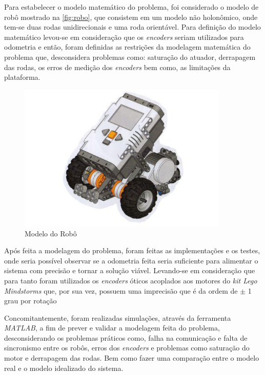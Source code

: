 Para estabelecer o modelo matemático do problema, foi considerado o modelo de robô mostrado na \autoref{fig:robo}, que consistem em um modelo não holonômico, onde tem-se duas rodas unidirecionais e uma roda orientável. Para definição do modelo matemático levou-se em consideração que os \emph{encoders} seriam utilizados para odometria e então, foram definidas as restrições da modelagem matemática do problema que, desconsidera problemas como: saturação do atuador, derrapagem das rodas, os erros de medição dos \emph{encoders} bem como, as limitações da plataforma. %

\begin{figure}[!htb]
	\centering
	\includegraphics[width=10cm]{./04-figuras/robo}
	\caption{Modelo do Robô}
	\label{fig:robo}
\end{figure}

Após feita a modelagem do problema, foram feitas as implementações e os testes, onde seria possível observar se a odometria feita seria suficiente para alimentar o sistema com precisão e tornar a solução viável. Levando-se em consideração que para tanto foram utilizados os \emph{encoders} óticos acoplados aos motores do \emph{kit Lego Mindstorms\textregistered} que, por sua vez, possuem uma imprecisão que é da ordem de $\pm$ 1 grau por rotação 

Concomitantemente, foram realizadas simulações, através da ferramenta \emph{MATLAB\textregistered}, a fim de prever e validar a modelagem feita do problema, desconsiderando os problemas práticos como, falha na comunicação e falta de sincronismo entre os robôs, erros dos \emph{encoders} e problemas como saturação do motor e derrapagem das rodas. Bem como fazer uma comparação entre o modelo real e o modelo idealizado do sistema.

